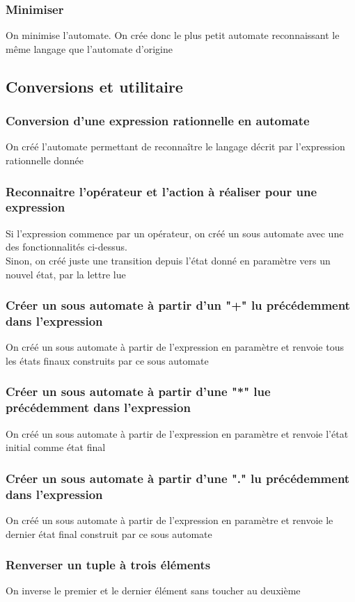\documentclass[a4paper, 12pt]{report}
\begin{document}
\subsubsection{Minimiser}
On minimise l'automate. On crée donc le plus petit automate reconnaissant le même langage que l'automate d'origine

\subsection{Conversions et utilitaire}
\subsubsection{Conversion d'une expression rationnelle en automate}
On créé l'automate permettant de reconnaître le langage décrit par l'expression rationnelle donnée
\subsubsection*{Reconnaitre l'opérateur et l'action à réaliser pour une expression}
Si l'expression commence par un opérateur, on créé un sous automate avec une des fonctionnalités ci-dessus.\\
Sinon, on créé juste une transition depuis l'état donné en paramètre vers un nouvel état, par la lettre lue
\subsubsection*{Créer un sous automate à partir d'un "+" lu précédemment dans l'expression}
On créé un sous automate à partir de l'expression en paramètre et renvoie tous les états finaux construits par ce sous automate
\subsubsection*{Créer un sous automate à partir d'une "*" lue précédemment dans l'expression}
On créé un sous automate à partir de l'expression en paramètre et renvoie l'état initial comme état final
\subsubsection*{Créer un sous automate à partir d'une "." lu précédemment dans l'expression}
On créé un sous automate à partir de l'expression en paramètre et renvoie le dernier état final construit par ce sous automate

\subsubsection*{Renverser un tuple à trois éléments}
On inverse le premier et le dernier élément sans toucher au deuxième
\end{document}
